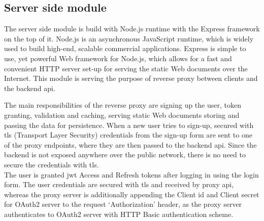 
\subsection{Server side module}\label{subsec:server-side-module}
The server side module is build with Node.js runtime with the Express framework on the top of it.
Node.js is an asynchronous JavaScript runtime, which is widely used to build high-end, scalable commercial applications.
Express is simple to use, yet powerful Web framework for Node.js, which allows for a fast and convenient HTTP server set-up for serving the static Web documents over the Internet.
This module is serving the purpose of reverse proxy between clients and the backend \gls{api}.

The main responsibilities of the reverse proxy are signing up the user, token granting, validation and caching, serving static Web documents storing and passing the data for persistence.
When a new user tries to sign-up, secured with \gls{tls} (Transport Layer Security) credentials from the sign-up form are sent to one of the proxy endpoints, where they are then passed to the backend \gls{api}.
Since the backend is not exposed anywhere over the public network, there is no need to secure the credentials with \gls{tls}.\\
The user is granted \gls{jwt} Access and Refresh tokens after logging in using the login form.
The user credentials are secured with \gls{tls} and received by proxy \gls{api}, whereas the proxy server is additionally appending the Client id and Client secret for OAuth2 server to the request `Authorization' header, as the proxy server authenticates to OAuth2 server with HTTP Basic authentication scheme.

